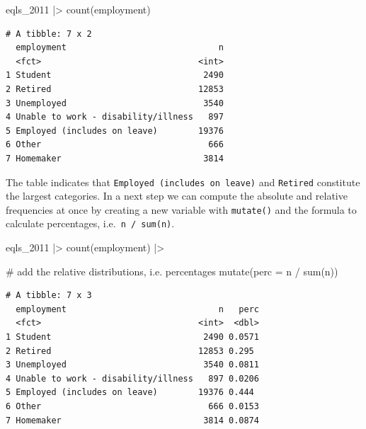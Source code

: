 \documentclass[
  letterpaper,
  DIV=11,
  numbers=noendperiod]{scrreprt}
\newenvironment{Shaded}{\begin{snugshade}}{\end{snugshade}}
\newcommand{\AttributeTok}[1]{\textcolor[rgb]{0.40,0.45,0.13}{#1}}
\newcommand{\CommentTok}[1]{\textcolor[rgb]{0.37,0.37,0.37}{#1}}
\newcommand{\FunctionTok}[1]{\textcolor[rgb]{0.28,0.35,0.67}{#1}}
\newcommand{\NormalTok}[1]{\textcolor[rgb]{0.00,0.23,0.31}{#1}}
\newcommand{\SpecialCharTok}[1]{\textcolor[rgb]{0.37,0.37,0.37}{#1}}
\begin{document}
\begin{Shaded}
\begin{Highlighting}[]
\NormalTok{eqls\_2011 }\SpecialCharTok{|\textgreater{}} \FunctionTok{count}\NormalTok{(employment)}
\end{Highlighting}
\end{Shaded}

\begin{verbatim}
# A tibble: 7 x 2
  employment                              n
  <fct>                               <int>
1 Student                              2490
2 Retired                             12853
3 Unemployed                           3540
4 Unable to work - disability/illness   897
5 Employed (includes on leave)        19376
6 Other                                 666
7 Homemaker                            3814
\end{verbatim}

The table indicates that \texttt{Employed\ (includes\ on\ leave)} and
\texttt{Retired} constitute the largest categories. In a next step we
can compute the absolute and relative frequencies at once by creating a
new variable with \texttt{mutate()} and the formula to calculate
percentages, i.e.~\texttt{n\ /\ sum(n)}.

\begin{Shaded}
\begin{Highlighting}[]
\NormalTok{eqls\_2011 }\SpecialCharTok{|\textgreater{}}
  \FunctionTok{count}\NormalTok{(employment) }\SpecialCharTok{|\textgreater{}}
  
  \CommentTok{\# add the relative distributions, i.e. percentages}
  \FunctionTok{mutate}\NormalTok{(}\AttributeTok{perc =}\NormalTok{ n }\SpecialCharTok{/} \FunctionTok{sum}\NormalTok{(n))}
\end{Highlighting}
\end{Shaded}

\begin{verbatim}
# A tibble: 7 x 3
  employment                              n   perc
  <fct>                               <int>  <dbl>
1 Student                              2490 0.0571
2 Retired                             12853 0.295 
3 Unemployed                           3540 0.0811
4 Unable to work - disability/illness   897 0.0206
5 Employed (includes on leave)        19376 0.444 
6 Other                                 666 0.0153
7 Homemaker                            3814 0.0874
\end{verbatim}
\end{document}
